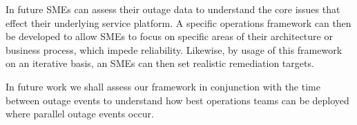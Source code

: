 \documentclass[conference]{IEEEtran}
\begin{document}
In future SMEs can assess their outage data to understand the core issues that effect their underlying service platform. A specific operations framework can then be developed to allow SMEs to focus on specific areas of their architecture or business process, which impede reliability. Likewise, by usage of this framework on an iterative basis, an SMEs can then set realistic remediation targets. \par

In future work we shall assess our framework in conjunction with the time between outage events to understand how best operations teams can be deployed where parallel outage events occur.  \par

%
%



%
%
\end{document}
